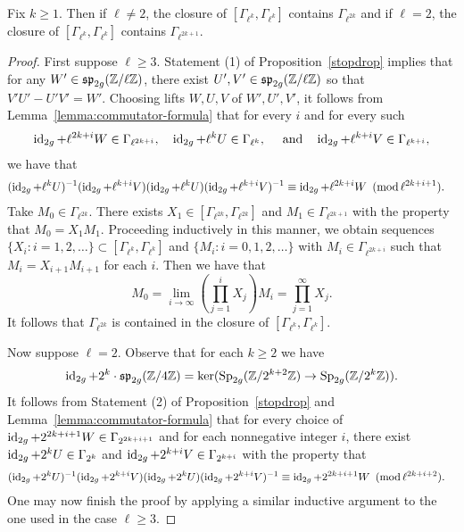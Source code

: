\begin{lemma} \label{proposition:commutator-effective}
	Fix $k \geq 1$. Then if $\ell \neq 2$, the closure of $[\Gamma_{\ell^k}, \Gamma_{\ell^k}]$ contains $\Gamma_{\ell^{2k}}$ and if $\ell = 2$, the closure of $[\Gamma_{\ell^k}, \Gamma_{\ell^k}]$ contains $\Gamma_{\ell^{2k+1}}$.
\end{lemma}
\begin{proof}
First suppose $\ell \geq 3$. Statement (1) of Proposition~\ref{stopdrop} implies that
for any $W' \in \mathfrak{sp}_{2g}(\mathbb Z/ \ell \mathbb Z)$, there exist $U', V' \in \mathfrak{sp}_{2g}(\mathbb Z/ \ell \mathbb Z)$ so that
$V'U' - U'V' = W'$.
Choosing lifts $W, U, V$ of $W', U', V'$, it follows from Lemma~\ref{lemma:commutator-formula} that for every $i$ and for every such
\begin{align*}
\operatorname{id}_{2g} + \ell^{2k+i} W \in \Gamma_{\ell^{2k+i}}, \quad
\operatorname{id}_{2g} + \ell^k U \in \Gamma_{\ell^k}, \quad \text{ and} \quad
\operatorname{id}_{2g} + \ell^{k+i} V \in \Gamma_{\ell^{k+i}},
\end{align*}
we have that
	\begin{align*}
		& (\operatorname{id}_{2g} + \ell^k U)^{-1}(\operatorname{id}_{2g} + \ell^{k+i} V)(\operatorname{id}_{2g} + \ell^k U)(\operatorname{id}_{2g} + \ell^{k+i} V)^{-1} \equiv \operatorname{id}_{2g} + \ell^{2k+i} W\,\,\, (\operatorname{mod}{\ell^{2k+i+1}}).
		\end{align*}
Take $M_0 \in \Gamma_{\ell^{2k}}$. There exists $X_1 \in [\Gamma_{\ell^{2k}}, \Gamma_{\ell^{2k}}]$ and $M_1 \in \Gamma_{\ell^{2k+1}}$ with the property that $M_0 = X_1M_1$. Proceeding inductively in this manner, we obtain sequences $\{X_i : i = 1, 2, \dots\} \subset [\Gamma_{\ell^k}, \Gamma_{\ell^k}]$ and $\{M_i : i = 0, 1, 2, \dots\}$ with $M_i \in \Gamma_{\ell^{2k+i}}$ such that $M_i = X_{i+1}M_{i+1}$ for each $i$. Then we have that
$$M_0 = \lim_{i \to \infty} \left(\prod_{j = 1}^{i} X_j \right)M_i = \prod_{j = 1}^\infty X_j.$$
It follows that $\Gamma_{\ell^{2k}}$ is contained in the closure of $[\Gamma_{\ell^k}, \Gamma_{\ell^k}]$.

Now suppose $\ell = 2$. Observe that for each $k \geq 2$ we have
$$\operatorname{id}_{2g} + 2^k \cdot \mathfrak{sp}_{2g}(\mathbb Z/ 4 \mathbb Z) = \ker(\operatorname{Sp}_{2g}(\mathbb Z/ 2^{k+2} \mathbb Z) \to \operatorname{Sp}_{2g}(\mathbb Z/ 2^k \mathbb Z)).$$
It follows from Statement (2) of Proposition~\ref{stopdrop} and Lemma~\ref{lemma:commutator-formula} that for every choice of $\operatorname{id}_{2g} + 2^{2k+i+1} W \in \Gamma_{2^{2k+i+1}}$ and for each nonnegative integer $i$, there exist $\operatorname{id}_{2g} + 2^k U \in \Gamma_{2^k}$ and $\operatorname{id}_{2g} + 2^{k+i} V \in \Gamma_{2^{k+i}}$ with the property that
	\begin{align*}
		& (\operatorname{id}_{2g} + 2^k U)^{-1}(\operatorname{id}_{2g} + 2^{k+i} V)(\operatorname{id}_{2g} + 2^k U)(\operatorname{id}_{2g} + 2^{k+i} V)^{-1} \equiv \operatorname{id}_{2g} + 2^{2k+i+1} W\,\,\, (\operatorname{mod}{\ell^{2k+i+2}}).
		\end{align*}
One may now finish the proof by applying a similar inductive argument to the one used in the case $\ell \geq 3$.
\end{proof}

